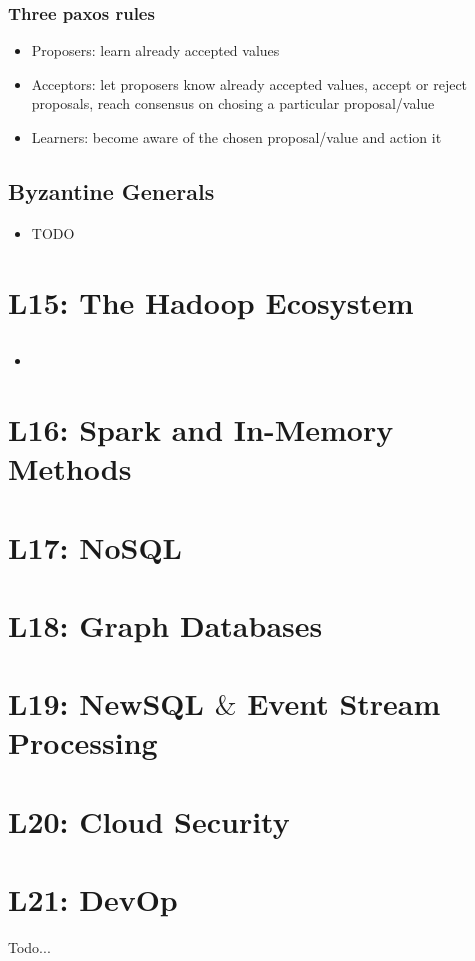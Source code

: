 \documentclass[a4paper]{article}
\begin{document}
\begin{multicols}{3}
\subsubsection*{Three paxos rules}
\begin{itemize}
    \item Proposers: learn already accepted values
    \item Acceptors: let proposers know already accepted values, accept or reject proposals, reach consensus on chosing a particular proposal/value
    \item Learners: become aware of the chosen proposal/value and action it
\end{itemize}

\subsection*{Byzantine Generals}
\begin{itemize}
    \item TODO
\end{itemize}


\section*{L15: The Hadoop Ecosystem}

\subsection*{}
\begin{itemize}
    \item 
\end{itemize}

\section*{L16: Spark and In-Memory Methods}

\section*{L17: NoSQL}

\section*{L18: Graph Databases}

\section*{L19: NewSQL $\&$ Event Stream Processing}

\section*{L20: Cloud Security}

\section*{L21: DevOp}

Todo...

\vspace*{\fill}
    \pagebreak
\end{multicols}
\end{document}
